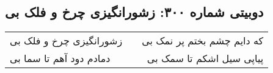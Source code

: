 \begin{center}
\section*{دوبیتی شماره ۳۰۰: زشورانگیزی چرخ و فلک بی}
\label{sec:300}
\begin{longtable}{l p{0.5cm} r}
زشورانگیزی چرخ و فلک بی
&&
که دایم چشم بختم پر نمک بی
\\
دمادم دود آهم تا سما بی
&&
پیاپی سیل اشکم تا سمک بی
\\
\end{longtable}
\end{center}
